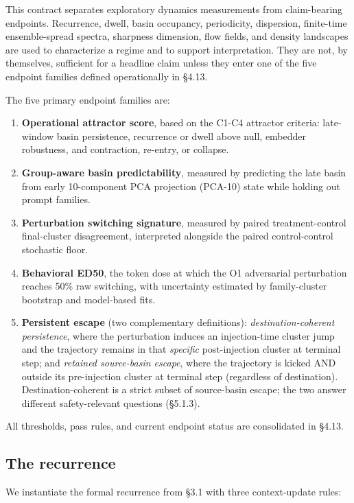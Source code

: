 \documentclass{article}
\theoremstyle{plain}
\theoremstyle{definition}
\begin{document}
This contract separates exploratory dynamics measurements from claim-bearing endpoints. Recurrence, dwell, basin occupancy, periodicity, dispersion, finite-time ensemble-spread spectra, sharpness dimension, flow fields, and density landscapes are used to characterize a regime and to support interpretation. They are not, by themselves, sufficient for a headline claim unless they enter one of the five endpoint families defined operationally in §4.13.

The five primary endpoint families are:

\begin{enumerate}
  \item \textbf{Operational attractor score}, based on the C1-C4 attractor criteria: late-window basin persistence, recurrence or dwell above null, embedder robustness, and contraction, re-entry, or collapse.
  \item \textbf{Group-aware basin predictability}, measured by predicting the late basin from early 10-component PCA projection (PCA-10) state while holding out prompt families.
  \item \textbf{Perturbation switching signature}, measured by paired treatment-control final-cluster disagreement, interpreted alongside the paired control-control stochastic floor.
  \item \textbf{Behavioral ED50}, the token dose at which the O1 adversarial perturbation reaches 50\% raw switching, with uncertainty estimated by family-cluster bootstrap and model-based fits.
  \item \textbf{Persistent escape} (two complementary definitions): \textit{destination-coherent persistence}, where the perturbation induces an injection-time cluster jump and the trajectory remains in that \textit{specific} post-injection cluster at terminal step; and \textit{retained source-basin escape}, where the trajectory is kicked AND outside its pre-injection cluster at terminal step (regardless of destination). Destination-coherent is a strict subset of source-basin escape; the two answer different safety-relevant questions (§5.1.3).
\end{enumerate}

All thresholds, pass rules, and current endpoint status are consolidated in §4.13.

\subsection{The recurrence}

We instantiate the formal recurrence from §3.1 with three context-update rules:
\end{document}
